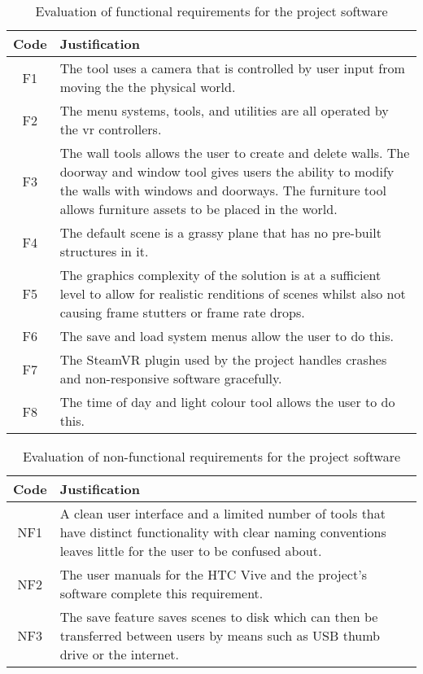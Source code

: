     \begin{center}
        \begin{longtable}{ | c | p{} |  }
            \caption{Evaluation of functional requirements for the project software}\label{tab:fun_requirements_eval}\\%
            \hline Code & Justification\\ \hline
                F1 & The tool uses a camera that is controlled by user input from moving the the physical world. \\  \hline
                F2 & The menu systems, tools, and utilities are all operated by the \acrshort{vr} controllers. \\\hline
                F3 & The wall tools allows the user to create and delete walls. The doorway and window tool gives users the ability to modify the walls with windows and doorways. The furniture tool allows furniture assets to be placed in the world. \\\hline
                F4 & The default scene is a grassy plane that has no pre-built structures in it. \\\hline
                F5 & The graphics complexity of the solution is at a sufficient level to allow for realistic renditions of scenes whilst also not causing frame stutters or frame rate drops. \\\hline
                F6 & The save and load system menus allow the user to do this. \\\hline
                F7 & The SteamVR plugin used by the project handles crashes and non-responsive software gracefully. \\\hline
                F8 & The time of day and light colour tool allows the user to do this. \\\hline
        \end{longtable}
    \end{center}
    
    \begin{center}
        \begin{longtable}{ | c | p{} | }
            \caption{Evaluation of non-functional requirements for the project software}\label{tab:nonfun_requirements_eval}\\%
            \hline Code & Justification\\ \hline
            NF1 & A clean user interface and a limited number of tools that have distinct functionality with clear naming conventions leaves little for the user to be confused about. \\  \hline
            NF2 & The user manuals for the HTC Vive and the project's software complete this requirement. \\\hline
            NF3 & The save feature saves scenes to disk which can then be transferred between users by means such as USB thumb drive or the internet. \\\hline
        \end{longtable}
    \end{center}

